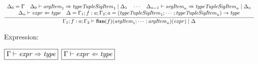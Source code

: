\begin{gather*}
  \infer{\Gamma_1; f: a; \Gamma_2 \vdash \mathbf{fun}(f)(\mathit{argItem}_1; \cdots; \mathit{argItem}_n)(\mathit{expr}) \mid \Delta}{
    \begin{array}{c}
      \Delta_0 = \Gamma
      \hspace{1em}
      \Delta_0 \vdash \mathit{argItem}_1 \Rightarrow \mathit{typeTupleSigItem}_1 \mid \Delta_1
      \hspace{1em}
      \cdots
      \hspace{1em}
      \Delta_{n - 1} \vdash \mathit{argItem}_n \Rightarrow \mathit{typeTupleSigItem}_n \mid \Delta_n
      \\
      \Delta_n \vdash \mathit{expr} \Leftarrow \mathit{type}
      \hspace{1em}
      \Delta = \Gamma_1; f: a; \Gamma_2; a = (\mathit{typeTupleSigItem}_1; \cdots; \mathit{typeTupleSigItem}_n) \rightarrow \mathit{type}
    \end{array}
  }
\end{gather*}

Expression:

$\fbox{$\Gamma \vdash \mathit{expr} \Rightarrow \mathit{type}$}$
$\fbox{$\Gamma \vdash \mathit{expr} \Leftarrow \mathit{type}$}$

